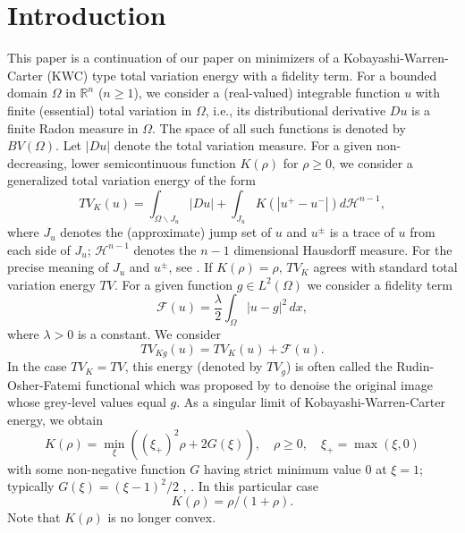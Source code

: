 \documentclass[12pt, reqno]{amsart}
\numberwithin{equation}{section}
\begin{document}
\maketitle


\section{Introduction} \label{SI} %


This paper is a continuation of our paper \cite{GKKOS} on minimizers of a Kobayashi-Warren-Carter (KWC) type total variation energy with a fidelity term.
 For a bounded domain $\Omega$ in $\mathbb{R}^n$ ($n\ge1$), we consider a (real-valued) integrable function $u$ with finite (essential) total variation in $\Omega$, i.e., its distributional derivative $Du$ is a finite Radon measure in $\Omega$.
 The space of all such functions is denoted by $BV(\Omega)$.
 Let $|Du|$ denote the total variation measure.
 For a given non-decreasing, lower semicontinuous function $K(\rho)$ for $\rho\ge0$, we consider a generalized total variation energy of the form
\[
	TV_K(u) = \int_{\Omega\backslash J_u} |Du|
	+ \int_{J_u} K \left( |u^+ - u^-| \right) d\mathcal{H}^{n-1},
\]
where $J_u$ denotes the (approximate) jump set of $u$ and $u^\pm$ is a trace of $u$ from each side of $J_u$; 
 $\mathcal{H}^{n-1}$ denotes the $n-1$ dimensional Hausdorff measure.
 For the precise meaning of $J_u$ and $u^\pm$, see \cite[Section 2]{AFP}.
 If $K(\rho)=\rho$, $TV_K$ agrees with standard total variation energy $TV$.
 For a given function $g\in L^2(\Omega)$ we consider a fidelity term 
\[
	\mathcal{F}(u)
	= \frac\lambda2 \int_\Omega |u - g|^2\, dx,
\]
where $\lambda>0$ is a constant.
 We consider
\[
	TV_{Kg}(u) = TV_K(u) + \mathcal{F}(u).
\]
In the case $TV_K=TV$, this energy (denoted by $TV_g$) is often called the Rudin-Osher-Fatemi functional which was proposed by \cite{ROF} to denoise the original image whose grey-level values equal $g$.
 As a singular limit of Kobayashi-Warren-Carter energy, we obtain
\[
	K(\rho) = \min_\xi \left( (\xi_+)^2 \rho + 2G(\xi) \right),
	\quad \rho \ge 0, \quad
	\xi_+ = \max(\xi, 0)
\]
with some non-negative function $G$ having strict minimum value $0$ at $\xi=1$;
 typically $G(\xi)=(\xi-1)^2/2$ \cite{GOU}, \cite{GOSU}.
 In this particular case
\begin{equation} \label{EK}
	K(\rho) = \rho / (1 + \rho).
\end{equation}
Note that $K(\rho)$ is no longer convex.
\end{document}
